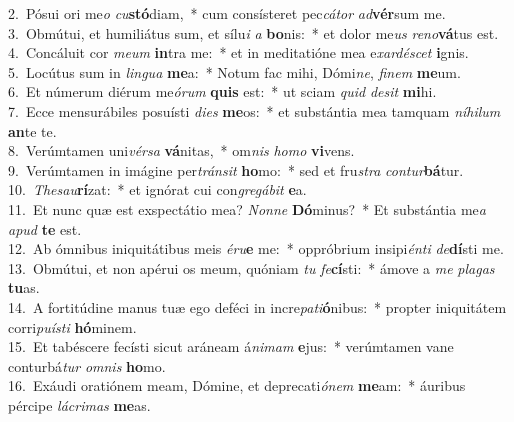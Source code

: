 {2.~}Pósui ori me\textit{o} \textit{cu}\textbf{stó}diam,~* cum consísteret pec\textit{cá}\textit{tor} \textit{ad}\textbf{vér}sum me.\\
{3.~}Obmútui, et humiliátus sum, et sílu\textit{i} \textit{a} \textbf{bo}nis:~* et dolor me\textit{us} \textit{re}\textit{no}\textbf{vá}tus est.\\
{4.~}Concáluit cor \textit{me}\textit{um} \textbf{in}tra me:~* et in meditatióne mea e\textit{xar}\textit{dé}\textit{scet} \textbf{i}gnis.\\
{5.~}Locútus sum in \textit{lin}\textit{gua} \textbf{me}a:~* Notum fac mihi, Dómi\textit{ne}, \textit{fi}\textit{nem} \textbf{me}um.\\
{6.~}Et númerum diérum me\textit{ó}\textit{rum} \textbf{quis} est:~* ut sciam \textit{quid} \textit{de}\textit{sit} \textbf{mi}hi.\\
{7.~}Ecce mensurábiles posuísti \textit{di}\textit{es} \textbf{me}os:~* et substántia mea tamquam \textit{ní}\textit{hi}\textit{lum} \textbf{an}te te.\\
{8.~}Verúmtamen uni\textit{vér}\textit{sa} \textbf{vá}nitas,~* om\textit{nis} \textit{ho}\textit{mo} \textbf{vi}vens.\\
{9.~}Verúmtamen in imágine per\textit{trán}\textit{sit} \textbf{ho}mo:~* sed et fru\textit{stra} \textit{con}\textit{tur}\textbf{bá}tur.\\
{10.~}\textit{The}\textit{sau}\textbf{rí}zat:~* et ignórat cui con\textit{gre}\textit{gá}\textit{bit} \textbf{e}a.\\
{11.~}Et nunc quæ est exspectátio mea? \textit{Non}\textit{ne} \textbf{Dó}minus?~* Et substántia me\textit{a} \textit{a}\textit{pud} \textbf{te} est.\\
{12.~}Ab ómnibus iniquitátibus meis \textit{é}\textit{ru}\textbf{e} me:~* oppróbrium insipi\textit{én}\textit{ti} \textit{de}\textbf{dí}sti me.\\
{13.~}Obmútui, et non apérui os meum, quóniam \textit{tu} \textit{fe}\textbf{cí}sti:~* ámove a \textit{me} \textit{pla}\textit{gas} \textbf{tu}as.\\
{14.~}A fortitúdine manus tuæ ego deféci in incre\textit{pa}\textit{ti}\textbf{ó}nibus:~* propter iniquitátem corri\textit{pu}\textit{í}\textit{sti} \textbf{hó}minem.\\
{15.~}Et tabéscere fecísti sicut aráneam á\textit{ni}\textit{mam} \textbf{e}jus:~* verúmtamen vane conturbá\textit{tur} \textit{om}\textit{nis} \textbf{ho}mo.\\
{16.~}Exáudi oratiónem meam, Dómine, et deprecati\textit{ó}\textit{nem} \textbf{me}am:~* áuribus pércipe \textit{lá}\textit{cri}\textit{mas} \textbf{me}as.\\
